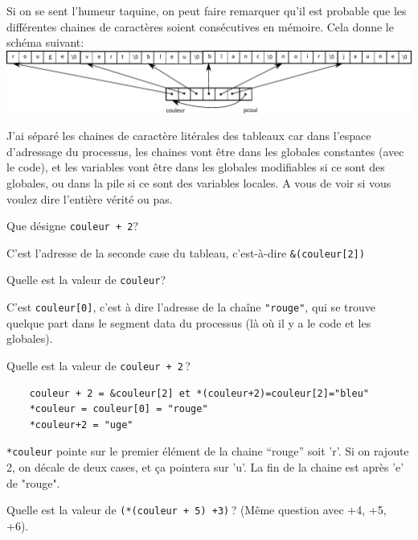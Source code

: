 \documentclass[10pt]{article}\usepackage[nu,correction]{esial}
\begin{document}
\begin{Reponse}
  Si on se sent l'humeur taquine, on peut faire remarquer qu'il est
  probable que les différentes chaines de caractères soient
  consécutives en mémoire. Cela donne le schéma suivant: \\

  \noindent
  \includegraphics[width=\linewidth]{memoire-couleur2.pdf}

  J'ai séparé les chaines de caractère litérales des tableaux car dans
  l'espace d'adressage du processus, les chaines vont être dans les
  globales constantes (avec le code), et les variables vont être dans
  les globales modifiables si ce sont des globales, ou dans la pile si
  ce sont des variables locales. A vous de voir si vous voulez dire
  l'entière vérité ou pas.
\end{Reponse}

\Question Que  désigne {\tt couleur + 2}?

\begin{Reponse}
  C'est l'adresse de la seconde case du tableau, c'est-à-dire
  \verb|&(couleur[2])|
\end{Reponse}

\Question Quelle est la valeur de {\tt *couleur}?

\begin{Reponse}
  C'est \verb|couleur[0]|, c'est à dire l'adresse de la chaîne
  \texttt{"rouge"}, qui se trouve quelque part dans le segment data du
  processus (là où il y a le code et les globales).
\end{Reponse}

\Question Quelle est la valeur de {\tt *couleur + 2}\,?

\begin{Reponse}
\begin{verbatim} 
    couleur + 2 = &couleur[2] et *(couleur+2)=couleur[2]="bleu"
    *couleur = couleur[0] = "rouge"
    *couleur+2 = "uge"
\end{verbatim}

\noindent\verb?*couleur? pointe sur le premier élément de la chaine ``rouge''
soit 'r'. Si on rajoute 2, on décale de deux cases, et ça pointera sur
'u'. La fin de la chaine est après 'e' de "rouge".
\end{Reponse}

\Question Quelle est la valeur de {\tt *(*(couleur + 5) +3)}\,? (Même
question avec +4, +5, +6).
\end{document}
